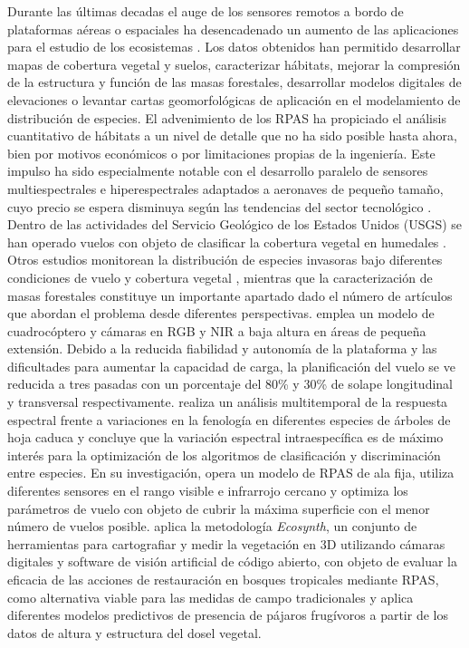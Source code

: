 \documentclass[onecolumn]{extarticle}
\begin{document}
Durante las últimas decadas el auge de los sensores remotos a bordo de
plataformas aéreas o espaciales ha desencadenado un aumento de las
aplicaciones para el estudio de los ecosistemas \citep{Wulder2004}. Los
datos obtenidos han permitido desarrollar mapas de cobertura vegetal y
suelos, caracterizar hábitats, mejorar la compresión de la estructura y
función de las masas forestales, desarrollar modelos digitales de
elevaciones o levantar cartas geomorfológicas de aplicación en el
modelamiento de distribución de especies. El advenimiento de los RPAS ha
propiciado el análisis cuantitativo de hábitats a un nivel de detalle
que no ha sido posible hasta ahora, bien por motivos económicos o por
limitaciones propias de la ingeniería. Este impulso ha sido
especialmente notable con el desarrollo paralelo de sensores
multiespectrales e hiperespectrales adaptados a aeronaves de pequeño
tamaño, cuyo precio se espera disminuya según las tendencias del sector
tecnológico . Dentro de las actividades del Servicio Geológico de los
Estados Unidos (USGS) se han operado vuelos con objeto de clasificar la
cobertura vegetal en humedales \citep{USGS2014}. Otros estudios
monitorean la distribución de especies invasoras bajo diferentes
condiciones de vuelo y cobertura vegetal \citep{Perroy2017}, mientras
que la caracterización de masas forestales constituye un importante
apartado dado el número de artículos que abordan el problema desde
diferentes perspectivas. \citep{Gini2012} emplea un modelo de
cuadrocóptero y cámaras en RGB y NIR a baja altura en áreas de pequeña
extensión. Debido a la reducida fiabilidad y autonomía de la plataforma
y las dificultades para aumentar la capacidad de carga, la planificación
del vuelo se ve reducida a tres pasadas con un porcentaje del 80\% y
30\% de solape longitudinal y transversal
respectivamente.\citep{Lisein2015} realiza un análisis multitemporal de
la respuesta espectral frente a variaciones en la fenología en
diferentes especies de árboles de hoja caduca y concluye que la
variación espectral intraespecífica es de máximo interés para la
optimización de los algoritmos de clasificación y discriminación entre
especies. En su investigación, opera un modelo de RPAS de ala fija,
utiliza diferentes sensores en el rango visible e infrarrojo cercano y
optimiza los parámetros de vuelo con objeto de cubrir la máxima
superficie con el menor número de vuelos posible. \citep{Zahawi2015}
aplica la metodología \emph{Ecosynth}, un conjunto de herramientas para
cartografiar y medir la vegetación en 3D utilizando cámaras digitales y
software de visión artificial de código abierto, con objeto de evaluar
la eficacia de las acciones de restauración en bosques tropicales
mediante RPAS, como alternativa viable para las medidas de campo
tradicionales y aplica diferentes modelos predictivos de presencia de
pájaros frugívoros a partir de los datos de altura y estructura del
dosel vegetal.
\end{document}
